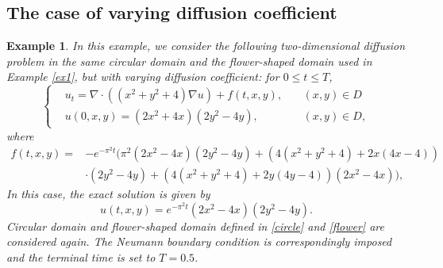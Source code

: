 \documentclass[3p,times]{elsarticle}
\newtheorem{example}{Example}[section]
\numberwithin{equation}{section}
\begin{document}
\subsection{The case of varying diffusion coefficient}



\begin{example}
	\label{ex2}
	In this example, we consider the following two-dimensional  diffusion problem  in the same circular domain and the flower-shaped domain used in Example \ref{ex1},  but with varying diffusion coefficient: for $0 \leq t \leq T$, 
	\begin{equation*}
		\left\{\begin{split}
			&u_t=\nabla \cdot \left((x^2+y^2+4)\nabla u\right)+f(t,x,y), \ &&(x,y)\in D\\
			&u(0,x,y) = \left(2 x^2+4x\right)\left(2 y^2-4y \right), \ \  &&(x, y) \in D,
		\end{split}
		\right.
	\end{equation*}
	where 
	\begin{equation*}
		\begin{split}
			f(t,x,y) =& -e^{-\pi^2 t}\Big(\pi^2\left(2 x^2-4x\right)\left(2 y^2-4y\right)+\left(4(x^2+y^2+4)+2x(4x-4)\right)\\
			&\cdot\left(2 y^2-4y \right)+\left(4(x^2+y^2+4)+2y(4y-4)\right)\left(2 x^2-4x \right)\Big),
		\end{split}
	\end{equation*}
	In this case, the exact solution is given by $$u(t,x,y)=e^{-\pi^2 t}\left(2 x^2-4x \right)\left(2 y^2-4y \right).$$
	Circular domain and flower-shaped domain defined in \eqref{circle} and \eqref{flower} are considered again. The Neumann boundary condition is correspondingly imposed and the terminal time is  set to $T=0.5$.
\end{example}
\end{document}
